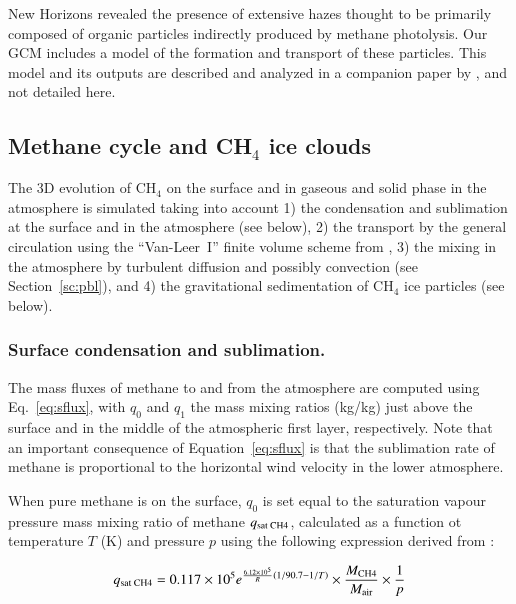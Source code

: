 New Horizons revealed the presence of extensive hazes thought to be primarily
composed of organic particles indirectly produced by methane photolysis. Our GCM
includes a model of the formation and transport of these particles. This model and
its outputs are described and analyzed in a companion paper by \cite{Bert:16ica}, and
not detailed here.


\subsection{Methane cycle and CH$_4$ ice clouds}
\label{sc:ch4_model}

The 3D evolution of CH$_4$ on the surface and in gaseous and solid phase in 
the atmosphere is simulated taking into account 1) the condensation and sublimation at the
surface and in the atmosphere (see below),
2) the transport by the general circulation using the ``Van-Leer~I'' finite volume scheme from \cite{Hour:99}, 
3) the mixing in the atmosphere by turbulent diffusion and possibly convection (see
Section~\ref{sc:pbl}), and 
4) the gravitational sedimentation of CH$_4$ ice particles (see below).  

\subsubsection{Surface condensation and sublimation.}

The mass fluxes of methane to and from the atmosphere are computed using 
Eq.~\ref{eq:sflux}, with $q_0$ and $q_1$ the mass mixing ratios  (kg/kg)
just above the surface and in the middle of the atmospheric first layer, respectively.
Note that an important consequence of Equation~\ref{eq:sflux} 
is that the sublimation rate of methane is 
proportional to the horizontal wind velocity in the lower atmosphere. 

When pure methane is on the surface, $q_0$ is set equal to the saturation vapour pressure 
mass mixing ratio of methane $q_{\mbox{\scriptsize  sat CH4}}$, 
calculated as a function ot temperature $T$ (K) and pressure $p$
using the following expression derived from \cite{Fray:09}:

\begin{equation}
q_{\mbox{\scriptsize sat CH4}} = 0.117 \times 10^{5}  
e^{{\frac{6.12 \times 10^{5}}{R}} 
\left(  {1}/{90.7} -{1}/{T} \right) } 
\times \frac{M_{\mbox{\scriptsize CH4}}}{M_{\mbox{\scriptsize air}}} \times \frac{1}{p}
\label{eq:ch4sat}
\end{equation}

